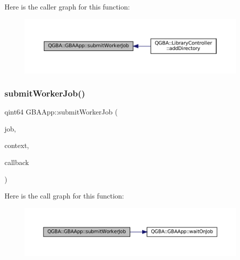 Here is the caller graph for this function\+:
\nopagebreak
\begin{figure}[H]
\begin{center}
\leavevmode
\includegraphics[width=350pt]{class_q_g_b_a_1_1_g_b_a_app_ad2506b0b8187a038933dc00a4fb0de88_icgraph}
\end{center}
\end{figure}
\mbox{\label{class_q_g_b_a_1_1_g_b_a_app_a70013367ed3d734e7b8a519b9de88b83}} 
\subsubsection{\texorpdfstring{submit\+Worker\+Job()}{submitWorkerJob()}\hspace{0.1cm}{\footnotesize\ttfamily [2/2]}}
{\footnotesize\ttfamily qint64 G\+B\+A\+App\+::submit\+Worker\+Job (\begin{DoxyParamCaption}\item[{std\+::function$<$ void()$>$}]{job,  }\item[{Q\+Object $\ast$}]{context,  }\item[{std\+::function$<$ void()$>$}]{callback }\end{DoxyParamCaption})}

Here is the call graph for this function\+:
\nopagebreak
\begin{figure}[H]
\begin{center}
\leavevmode
\includegraphics[width=350pt]{class_q_g_b_a_1_1_g_b_a_app_a70013367ed3d734e7b8a519b9de88b83_cgraph}
\end{center}
\end{figure}
\mbox{\label{class_q_g_b_a_1_1_g_b_a_app_a7785f5a8ef24ecc09be362ce641f24dd}} 
